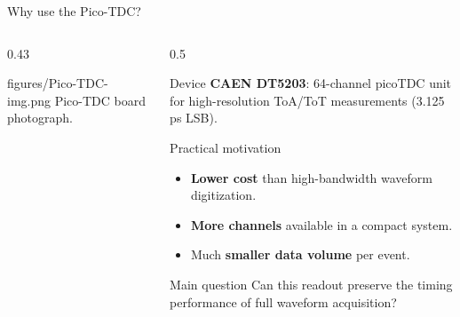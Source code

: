 \begin{frame}{Why use the Pico-TDC?}
\small

\begin{columns}[T,totalwidth=\textwidth]

\begin{column}{0.43\textwidth}
\centering

\smartimage[0.92\linewidth]{0.80\textheight}
{figures/Pico-TDC-img.png}
{Pico-TDC board photograph.}
\end{column}

\begin{column}{0.5\textwidth}

\begin{block}{Device}
    \textbf{CAEN DT5203}: 64-channel picoTDC unit for high-resolution ToA/ToT measurements (3.125 ps LSB).
\end{block}

\begin{block}{Practical motivation}
\begin{itemize}
    \item \textbf{Lower cost} than high-bandwidth waveform digitization.
    \item \textbf{More channels} available in a compact system.
    \item Much \textbf{smaller data volume }per event.
  
\end{itemize}
\end{block}

\vspace{0.3em}

\begin{alertblock}{Main question}
\centering
Can this readout preserve the timing performance of full waveform acquisition?
\end{alertblock}

\end{column}

\end{columns}

\end{frame}
